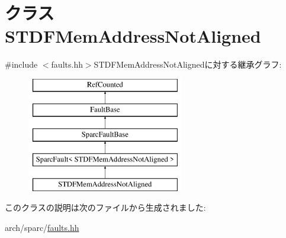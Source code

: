 \hypertarget{classSparcISA_1_1STDFMemAddressNotAligned}{
\section{クラス STDFMemAddressNotAligned}
\label{classSparcISA_1_1STDFMemAddressNotAligned}
}


{\ttfamily \#include $<$faults.hh$>$}STDFMemAddressNotAlignedに対する継承グラフ:\begin{figure}[H]
\begin{center}
\leavevmode
\includegraphics[height=5cm]{classSparcISA_1_1STDFMemAddressNotAligned}
\end{center}
\end{figure}


このクラスの説明は次のファイルから生成されました:\begin{DoxyCompactItemize}
\item 
arch/sparc/\hyperlink{arch_2sparc_2faults_8hh}{faults.hh}\end{DoxyCompactItemize}
